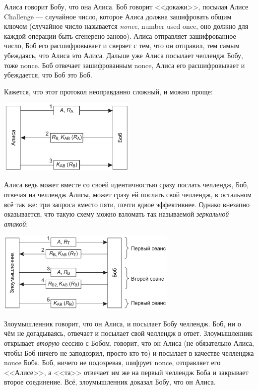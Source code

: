 \documentclass{../../text-style}
\begin{document}
Алиса говорит Бобу, что она Алиса. Боб говорит <<докажи>>, посылая Алисе Challenge --- случайное число, которое Алиса должна зашифровать общим ключом (случайное число называется \emph{nonce}, number used once, оно должно для каждой операции быть сгенерено заново). Алиса отправляет зашифрованное число, Боб его расшифровывает и сверяет с тем, что он отправил, тем самым убеждаясь, что Алиса это Алиса. Дальше уже Алиса посылает челлендж Бобу, тоже nonce. Боб отвечает зашифрованным nonce, Алиса его расшифровывает и убеждается, что Боб это Боб.

Кажется, что этот протокол неоправданно сложный, и можно проще:

\begin{center}
    \includegraphics[width=0.5\textwidth]{simpleChallengeResponse.png}
\end{center}

Алиса ведь может вместе со своей идентичностью сразу послать челлендж, Боб, отвечая на челлендж Алисы, может сразу ей послать свой челлендж, в остальном всё так же: три запроса вместо пяти, почти вдвое эффективнее. Однако внезапно оказывается, что такую схему можно взломать так называемой \emph{зеркальной атакой}: 

\begin{center}
    \includegraphics[width=0.65\textwidth]{mirrorAttack.png}
\end{center}

Злоумышленник говорит, что он Алиса, и посылает Бобу челлендж. Боб, ни о чём не догадываясь, отвечает и посылает свой челлендж в ответ. Злоумышленник открывает \emph{вторую} сессию с Бобом, говорит, что он Алиса (не обязательно Алиса, чтобы Боб ничего не заподозрил, просто кто-то) и посылает в качестве челленджа nonce Боба. Боб, ничего не подозревая, шифрует nonce, отправляет его <<Алисе>>, а <<та>> отвечает им же на первый челлендж Боба и закрывает второе соединение. Всё, злоумышленник доказал Бобу, что он Алиса.
\end{document}

